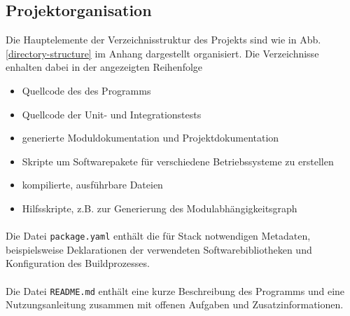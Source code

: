 \subsection{Projektorganisation}
Die Hauptelemente der Verzeichnisstruktur des Projekts sind wie in Abb. \ref{directory-structure}
im Anhang dargestellt organisiert. Die Verzeichnisse enhalten dabei in der angezeigten Reihenfolge

\begin{itemize}
    \item Quellcode des des Programms
    \item Quellcode der Unit- und Integrationstests
    \item generierte Moduldokumentation und Projektdokumentation
    \item Skripte um Softwarepakete für verschiedene Betriebssysteme zu erstellen
    \item kompilierte, ausführbare Dateien
    \item Hilfsskripte, z.B. zur Generierung des Modulabhängigkeitsgraph
\end{itemize}

\paragraph{}
Die Datei \texttt{package.yaml} enthält die für Stack notwendigen Metadaten,
beispielsweise Deklarationen der verwendeten Softwarebibliotheken und Konfiguration
des Buildprozesses.

\paragraph{}
Die Datei \texttt{README.md} enthält eine kurze Beschreibung des
Programms und eine Nutzungsanleitung zusammen mit offenen Aufgaben und
Zusatzinformationen.